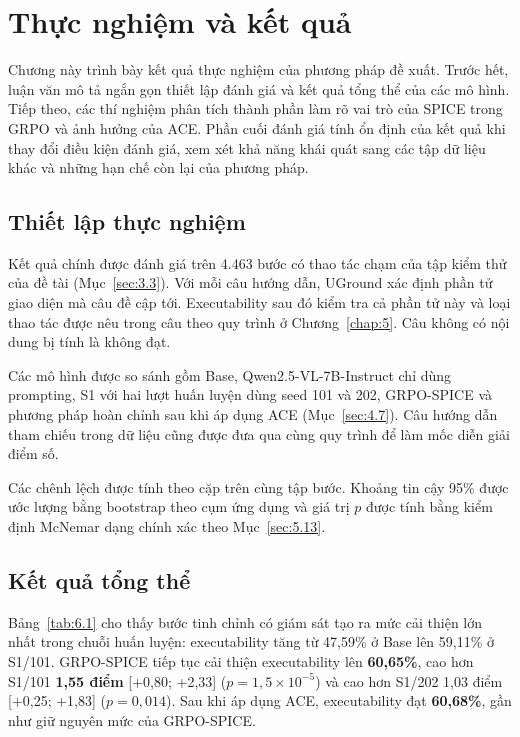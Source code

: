 \chapter{Thực nghiệm và kết quả}
\label{chap:6}

Chương này trình bày kết quả thực nghiệm của phương pháp đề xuất. Trước hết, luận văn mô tả ngắn gọn thiết lập đánh giá và kết quả tổng thể của các mô hình. Tiếp theo, các thí nghiệm phân tích thành phần làm rõ vai trò của SPICE trong GRPO và ảnh hưởng của ACE. Phần cuối đánh giá tính ổn định của kết quả khi thay đổi điều kiện đánh giá, xem xét khả năng khái quát sang các tập dữ liệu khác và những hạn chế còn lại của phương pháp.

\section{Thiết lập thực nghiệm}\label{sec:6.1}\label{sec:6.6}

Kết quả chính được đánh giá trên 4.463 bước có thao tác chạm của tập kiểm thử của đề tài (Mục~\ref{sec:3.3}). Với mỗi câu hướng dẫn, UGround xác định phần tử giao diện mà câu đề cập tới. Executability sau đó kiểm tra cả phần tử này và loại thao tác được nêu trong câu theo quy trình ở Chương~\ref{chap:5}. Câu không có nội dung bị tính là không đạt.

Các mô hình được so sánh gồm Base, Qwen2.5-VL-7B-Instruct chỉ dùng prompting, S1 với hai lượt huấn luyện dùng seed 101 và 202, GRPO-SPICE và phương pháp hoàn chỉnh sau khi áp dụng ACE (Mục~\ref{sec:4.7}). Câu hướng dẫn tham chiếu trong dữ liệu cũng được đưa qua cùng quy trình để làm mốc diễn giải điểm số.

Các chênh lệch được tính theo cặp trên cùng tập bước. Khoảng tin cậy 95\% được ước lượng bằng bootstrap theo cụm ứng dụng và giá trị $p$ được tính bằng kiểm định McNemar dạng chính xác theo Mục~\ref{sec:5.13}.

\section{Kết quả tổng thể}\label{sec:6.2}

Bảng~\ref{tab:6.1} cho thấy bước tinh chỉnh có giám sát tạo ra mức cải thiện lớn nhất trong chuỗi huấn luyện: executability tăng từ 47,59\% ở Base lên 59,11\% ở S1/101. GRPO-SPICE tiếp tục cải thiện executability lên \textbf{60,65\%}, cao hơn S1/101 \textbf{1,55 điểm} [+0,80; +2,33] ($p = 1{,}5 \times 10^{-5}$) và cao hơn S1/202 1,03 điểm [+0,25; +1,83] ($p = 0{,}014$). Sau khi áp dụng ACE, executability đạt \textbf{60,68\%}, gần như giữ nguyên mức của GRPO-SPICE.

